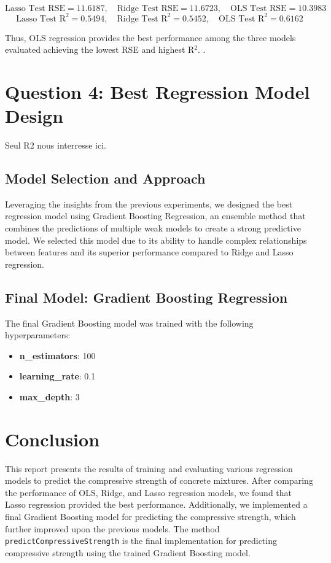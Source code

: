 \documentclass[a4paper,12pt]{article}
\begin{document}
\[
\text{Lasso Test RSE} = 11.6187, \quad \text{Ridge Test RSE} = 11.6723, \quad \text{OLS Test RSE} = 10.3983
\]
\[
\text{Lasso Test R}^2 = 0.5494, \quad \text{Ridge Test R}^2 = 0.5452, \quad \text{OLS Test R}^2 = 0.6162
\]

Thus, OLS regression provides the best performance among the three models evaluated achieving the lowest RSE and highest R\(^2\). .

\section*{Question 4: Best Regression Model Design}

Seul R2 nous interresse ici.

\subsection*{Model Selection and Approach}
Leveraging the insights from the previous experiments, we designed the best regression model using Gradient Boosting Regression, an ensemble method that combines the predictions of multiple weak models to create a strong predictive model. We selected this model due to its ability to handle complex relationships between features and its superior performance compared to Ridge and Lasso regression.

\subsection*{Final Model: Gradient Boosting Regression}
The final Gradient Boosting model was trained with the following hyperparameters:
\begin{itemize}
    \item \textbf{n\_estimators}: 100
    \item \textbf{learning\_rate}: 0.1
    \item \textbf{max\_depth}: 3
\end{itemize}



\section*{Conclusion}
This report presents the results of training and evaluating various regression models to predict the compressive strength of concrete mixtures. After comparing the performance of OLS, Ridge, and Lasso regression models, we found that Lasso regression provided the best performance. Additionally, we implemented a final Gradient Boosting model for predicting the compressive strength, which further improved upon the previous models. The method \texttt{predictCompressiveStrength} is the final implementation for predicting compressive strength using the trained Gradient Boosting model.
\end{document}
